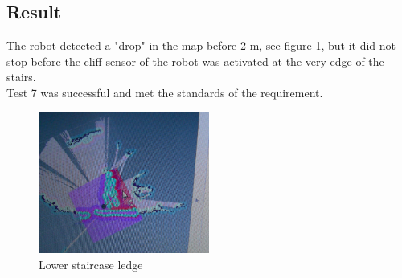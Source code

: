 \subsection{Result}
The robot detected a "drop" in the map before 2 m, see figure \ref{fig:ledge}, but it did not stop before the cliff-sensor of the robot was activated at the very edge of the stairs.\\
Test 7 was successful and met the standards of the requirement.
\begin{figure}[h]
    \centering
    \includegraphics[width=0.5\textwidth]{figures/ledgePicture.png}
    \caption{Lower staircase ledge} 
    \label{fig:ledge} 
\end{figure}